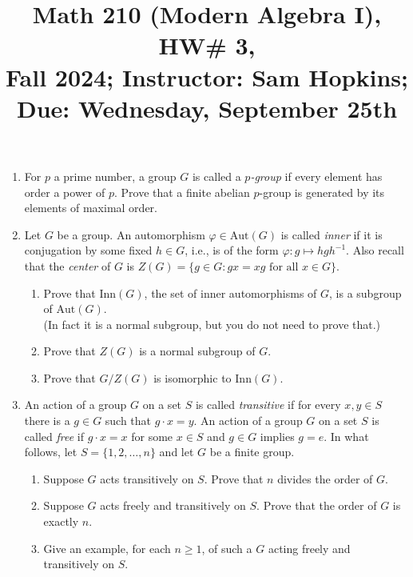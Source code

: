 \documentclass[11pt]{article}
\title{Math 210 (Modern Algebra I), HW\# 3, \\ {\normalsize Fall 2024; Instructor: Sam Hopkins; Due: Wednesday, September 25th}}
\date{}
\begin{document}
\maketitle

\thispagestyle{empty}
\begin{enumerate}

\item For $p$ a prime number, a group $G$ is called a \emph{$p$-group} if every element has order a power of $p$. Prove that a finite abelian $p$-group is generated by its elements of maximal order.

\item Let $G$ be a group. An automorphism $\varphi\in \mathrm{Aut}(G)$ is called \emph{inner} if it is conjugation by some fixed $h\in G$, i.e., is of the form $\varphi\colon g\mapsto hgh^{-1}$. Also recall that the \emph{center} of $G$ is $Z(G) = \{g \in G\colon gx = xg \textrm{ for all $x\in G$}\}$. 
\begin{enumerate}
\item Prove that $\mathrm{Inn}(G)$, the set of inner automorphisms of $G$, is a subgroup of $\mathrm{Aut}(G)$. \\ (In fact it is a normal subgroup, but you do not need to prove that.)
\item Prove that $Z(G)$ is a normal subgroup of $G$.
\item Prove that $G/Z(G)$ is isomorphic to $\mathrm{Inn}(G)$.
\end{enumerate}

\item An action of a group $G$ on a set $S$ is called \emph{transitive} if for every $x,y \in S$ there is a $g\in G$ such that $g \cdot x = y$. An action of a group $G$ on a set $S$ is called \emph{free} if $g \cdot x = x$ for some $x\in S$ and $g\in G$ implies $g=e$. In what follows, let $S=\{1,2,\ldots,n\}$ and let $G$ be a finite group.
\begin{enumerate}
\item Suppose $G$ acts transitively on $S$. Prove that $n$ divides the order of $G$.
\item Suppose $G$ acts freely and transitively on $S$. Prove that the order of $G$ is exactly $n$.
\item Give an example, for each $n \geq 1$, of such a $G$ acting freely and transitively on $S$.
\end{enumerate}


\end{enumerate}
\end{document}
